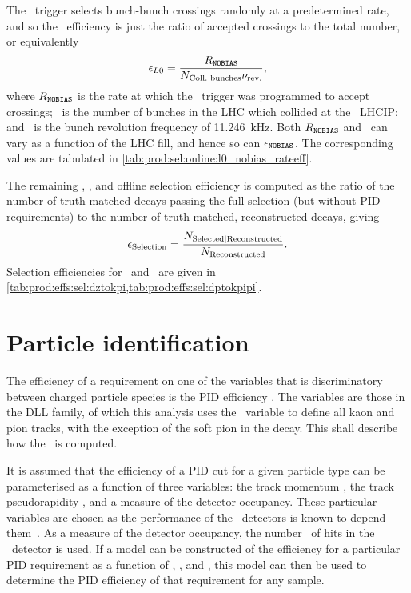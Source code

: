 The \lzero\ trigger selects bunch-bunch crossings randomly at a predetermined 
rate, and so the \lzero\ efficiency is just the ratio of accepted crossings to 
the total number, or equivalently
\begin{equation}
  \eff_{\lzero} = \frac{%
    R_{\nobias}
  }{%
    \ncollbunches\revfreq
  },
  \label{eqn:prod:effs:sel:l0}
\end{equation}
where $R_{\texttt{NOBIAS}}$ is the rate at which the \lzero\ trigger was programmed to 
accept crossings; \ncollbunches\ is the number of bunches in the \ac{LHC} which 
collided at the \lhcb\ \acl{LHCIP}; and \revfreq\ is the bunch revolution 
frequency of \SI{11.246}{\kilo\hertz}.
Both $R_{\texttt{NOBIAS}}$ and \ncollbunches\ can vary as a function of the \ac{LHC} 
fill, and hence so can $\epsilon_{\texttt{NOBIAS}}$.
The corresponding values are tabulated in 
\cref{tab:prod:sel:online:l0_nobias_rateeff}.

The remaining \hltone, \hlttwo, and offline selection efficiency is computed as 
the ratio of the number of truth-matched decays passing the full selection (but 
without \ac{PID} requirements) to the number of truth-matched, reconstructed 
decays, giving
\begin{equation}
  \effselection = \frac{%
    N_{\text{Selected}|\text{Reconstructed}}
  }{%
    N_{\text{Reconstructed}}
  }.
  \label{eqn:prod:effs:sel}
\end{equation}
Selection efficiencies for \DzToKpi\ and \DpToKpipi\ are given in 
\cref{tab:prod:effs:sel:dztokpi,tab:prod:effs:sel:dptokpipi}.

\section{Particle identification}
\label{chap:prod:effs:pid}

The efficiency of a requirement on one of the variables that is discriminatory 
between charged particle species is the \ac{PID} efficiency \effpid.
The variables are those in the \acf{DLL} family, of which this analysis uses 
the \dllkpi\ variable to define all kaon and pion tracks, with the exception of 
the soft pion in the \DstToDzpi decay.
This  shall describe how the \effpid\ is computed.

It is assumed that the efficiency of a \ac{PID} cut for a given particle type 
can be parameterised as a function of three variables: the track momentum 
\ptot, the track pseudorapidity \Eta, and a measure of the detector occupancy.
These particular variables are chosen as the performance of the \rich\ 
detectors is known to depend them~\cite{Adinolfi:2012qfa}.
As a measure of the detector occupancy, the number \nspd\ of hits in the \spd\ 
detector is used.
If a model can be constructed of the efficiency for a particular \ac{PID} 
requirement as a function of \ptot, \Eta, and \nspd, this model can then be 
used to determine the \ac{PID} efficiency of that requirement for any sample.

